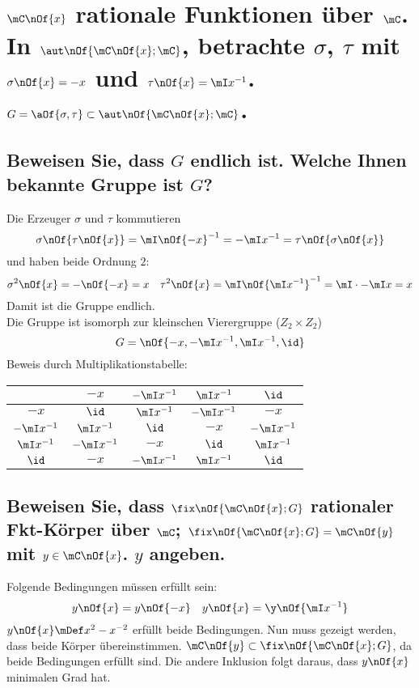 \section{$\mC\nOf{x}$ rationale Funktionen über $\mC$. In $\aut\nOf{\mC\nOf{x};\mC}$, betrachte $\sigma$, $\tau$ mit $\sigma\nOf{x} = - x$ und $\tau\nOf{x} = \mI x^{-1}$. $G = \aOf{\sigma,\tau}\subset \aut\nOf{\mC\nOf{x};\mC}$.}

\subsection{Beweisen Sie, dass $G$ endlich ist. Welche Ihnen bekannte Gruppe ist $G$?}
Die Erzeuger $\sigma$ und $\tau$ kommutieren
\begin{equation}
\sigma\nOf{\tau\nOf{x}} = \mI\nOf{-x}^{-1} = -\mI x^{-1} = \tau\nOf{\sigma\nOf{x}}
\end{equation}
und haben beide Ordnung $2$:
\begin{equation}
	\sigma^2\nOf{x} = -\nOf{-x} = x \quad \tau^2\nOf{x} = \mI\nOf{\mI x^{-1}}^{-1} = \mI\cdot -\mI x = x
\end{equation}
Damit ist die Gruppe endlich.\\
Die Gruppe ist isomorph zur kleinschen Vierergruppe ($Z_2\times Z_2$)
\begin{equation}
	G = \nOf{-x,-\mI x^{-1},\mI x^{-1},\id}
\end{equation}
Beweis durch Multiplikationstabelle:
\begin{table}[H]
	\centering
	\begin{tabular}{|c| *{4}{c|}}\hline
		 & $-x$ & $-\mI x^{-1}$ & $\mI x^{-1}$ & $\id$ \\\hline
		 $-x$ & $\id$ & $\mI x^{-1}$ & $-\mI x^{-1}$ & $-x$ \\\hline
		 $-\mI x^{-1}$ & $\mI x^{-1}$ & $\id$ & $-x$ & $-\mI x^{-1}$ \\\hline
		 $\mI x^{-1}$ & $-\mI x^{-1}$ & $-x$ & $\id$ & $\mI x^{-1}$ \\\hline
		 $\id$ & $-x$ & $-\mI x^{-1}$ & $\mI x^{-1}$ & $\id$ \\\hline
	\end{tabular}
\end{table}

\subsection{Beweisen Sie, dass $\fix\nOf{\mC\nOf{x};G}$ rationaler Fkt-Körper über $\mC$; $\fix\nOf{\mC\nOf{x};G} = \mC\nOf{y}$ mit $y\in\mC\nOf{x}$. $y$ angeben.}
Folgende Bedingungen müssen erfüllt sein:
\begin{equation}
	y\nOf{x} = y\nOf{-x} \quad y\nOf{x} = \y\nOf{\mI x^{-1}}
\end{equation}
$y\nOf{x} \mDef x^2-x^{-2}$ erfüllt beide Bedingungen. Nun muss gezeigt werden, dass beide Körper übereinstimmen. $\mC\nOf{y} \subset \fix\nOf{\mC\nOf{x};G}$, da beide Bedingungen erfüllt sind. Die andere Inklusion folgt daraus, dass $y\nOf{x}$ minimalen Grad hat.
